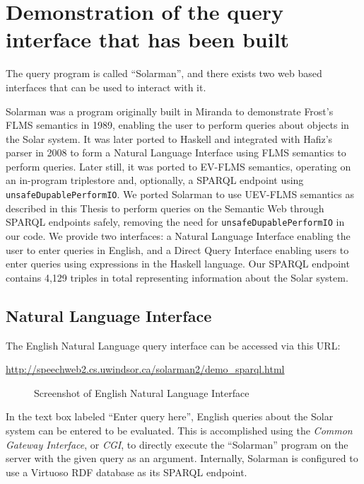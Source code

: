 \documentclass[../main.tex]{subfiles}
\begin{document}
\chapter{Demonstration of the query interface that has been built}
\label{chapter:demonstration}

The query program is called ``Solarman'', and there exists two web based interfaces that can be used to interact with it.

Solarman was a program originally built in Miranda to demonstrate Frost's FLMS semantics in 1989\cite{frost1989constructing}, enabling the user
to perform queries about objects in the Solar system.  It was later ported to Haskell and integrated with Hafiz's parser in 2008\cite{frosthafiz2008}
to form a Natural Language Interface using FLMS semantics to perform queries.  Later still, it was ported to EV-FLMS semantics, operating on an in-program
triplestore and, optionally, a SPARQL endpoint using \texttt{unsafeDupablePerformIO}.  We ported Solarman to use UEV-FLMS semantics as described in this Thesis to perform queries on the Semantic Web through SPARQL endpoints safely, removing the need for \texttt{unsafeDupablePerformIO} in our code.
We provide two interfaces: a Natural Language Interface enabling the user to enter queries in English, and a Direct Query Interface enabling users
to enter queries using expressions in the Haskell language.   Our SPARQL endpoint contains 4,129 triples in total representing information about the Solar system.

\section{Natural Language Interface}

The English Natural Language query interface can be accessed via this URL:

\url{http://speechweb2.cs.uwindsor.ca/solarman2/demo_sparql.html}


\begin{figure}[h]
\centering
{}
\caption{Screenshot of English Natural Language Interface}
\end{figure}
In the text box labeled ``Enter query here'', English queries about the Solar system can be entered to be evaluated.  This is accomplished using the {\em Common Gateway Interface}, or {\em CGI}, to directly execute the ``Solarman'' program on the server with the given query as an argument.  Internally, Solarman is configured to use a Virtuoso\cite{virtuoso} RDF database as its SPARQL endpoint.
\end{document}
